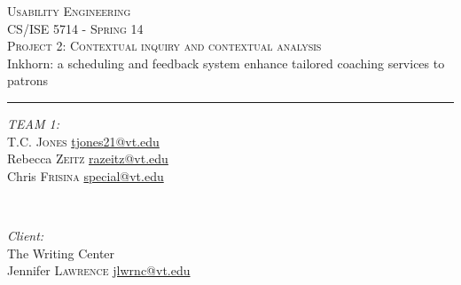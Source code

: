 \documentclass[12pt]{article} %
\newcommand{\HRule}{\rule{\linewidth}{0.5mm}} %
\begin{document}
\begin{titlepage}

  \center %

  \textsc{\LARGE Usability Engineering}\\[1.5mm] 
  \textsc{\Large CS/ISE 5714 - Spring 14}\\[1mm] 
  \textsc{Project 2: Contextual inquiry and contextual analysis}\\[1mm] 

  { \small Inkhorn: a scheduling and feedback system enhance tailored coaching services to patrons }\\
  \HRule
  \vspace{4mm}

  \begin{minipage}{0.4\textwidth}
  \begin{flushleft} \small
  \emph{TEAM 1:}\\
  T.C. \textsc{Jones} \href{mailto:tjones21@vt.edu}{tjones21@vt.edu}\\
  Rebecca \textsc{Zeitz} \href{mailto:razeitz@vt.edu}{razeitz@vt.edu}\\
  Chris \textsc{Frisina}  \href{mailto:special@vt.edu}{special@vt.edu}\\
  \end{flushleft}
  \end{minipage}
  ~
  \begin{minipage}{0.4\textwidth}
  \begin{flushright} \small
  \emph{Client:} \\
  The Writing Center\\
  Jennifer \textsc{Lawrence}  \href{mailto:jlwrnc@vt.edu}{jlwrnc@vt.edu}
  \end{flushright}
  \end{minipage}\\
  [5mm]
  
  \begingroup
  \def\addvspace#1{}
    \tableofcontents\hypertarget{toc}{}
  \endgroup
\end{titlepage}
\end{document}
